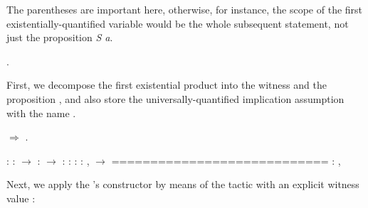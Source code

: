 The parentheses are important here, otherwise, for instance, the scope
of the first existentially-quantified variable  would be the whole
subsequent statement, not just the proposition \textit{S a}.


\begin{coqdoccode}
\coqdocemptyline
\coqdocnoindent
{}.\coqdoceol
\coqdocemptyline
\end{coqdoccode}


First, we decompose the first existential product into the witness 
and the proposition , and also store the universally-quantified
implication assumption with the name .


\begin{coqdoccode}
\coqdocemptyline
\coqdocnoindent
{}\ensuremath{\Rightarrow}  .\coqdoceol
\end{coqdoccode}


\coqdoceol
\coqdocemptyline
\coqdocindent{1.00em}
 : \coqdoceol
\coqdocindent{1.00em}
 :  \ensuremath{\rightarrow} \coqdoceol
\coqdocindent{1.00em}
 :  \ensuremath{\rightarrow} \coqdoceol
\coqdocindent{1.00em}
 : \coqdoceol
\coqdocindent{1.00em}
 :  \coqdoceol
\coqdocindent{1.00em}
 : \coqdockw{\ensuremath{\forall}}  : ,   \ensuremath{\rightarrow}  \coqdoceol
\coqdocindent{1.00em}
============================\coqdoceol
\coqdocindent{1.50em}
  : ,  

\coqdocemptyline
Next, we apply the 's constructor by means of the 
tactic with an explicit witness value : 




